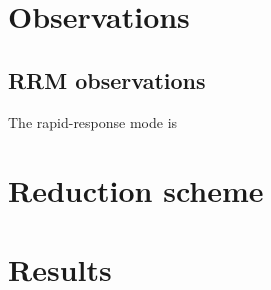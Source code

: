 \documentclass[iop, twocolappendix, numberedappendix, tighten, appendixfloats]{emulateapj}
\begin{document}
	\cleardoublepage

	
	\section{Observations}


	
	\subsection{RRM observations} \label{RRM}
	The rapid-response mode is 
	
	\section{Reduction scheme}
	
	
	\section{Results}
	
\end{document}
